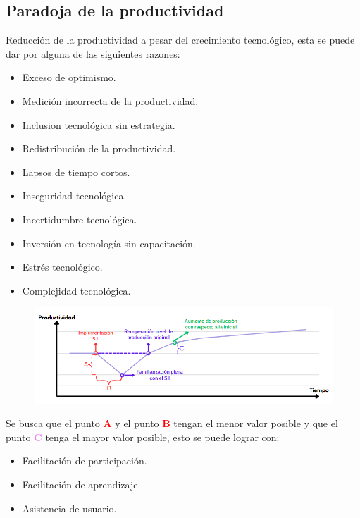 \documentclass{templateNote}
\begin{document}
\subsection{Paradoja de la productividad}
Reducción de la productividad a pesar del crecimiento tecnológico, esta se puede dar por alguna de las siguientes razones:
\begin{itemize}
    \item Exceso de optimismo.
    \item Medición incorrecta de la productividad.
    \item Inclusion tecnológica sin estrategia.
    \item Redistribución de la productividad.
    \item Lapsos de tiempo cortos.
    \item Inseguridad tecnológica.
    \item Incertidumbre tecnológica.
    \item Inversión en tecnología sin capacitación.
    \item Estrés tecnológico.
    \item Complejidad tecnológica.
\end{itemize}
\begin{center}
    \begin{figure}[H]
        \centering
        \includegraphics[width=1\textwidth]{img/paradoja.png}
    \end{figure}
\end{center}
Se busca que el punto \textcolor{red}{\textbf{A}} y el punto \textcolor{red}{\textbf{B}} tengan el menor valor posible y que el punto \textcolor{violet}{\textbf{C}} tenga el mayor valor posible, esto se puede lograr con:
\begin{itemize}
    \item Facilitación de participación.
    \item Facilitación de aprendizaje.
    \item Asistencia de usuario.
\end{itemize}
\end{document}
